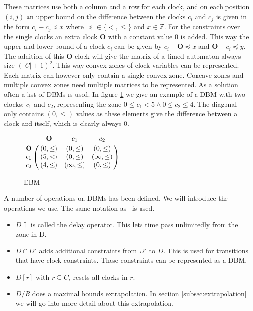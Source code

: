 These matrices use both a column and a row for each clock, and on each position $(i,j)$ an upper bound on the difference between the clocks $c_i$ and $c_j$ is given in the form $c_i - c_j \preceq x$ where $\preceq \in \{<, \leq\}$ and $x \in \mathbb{Z}$. For the constraints over the single clocks an extra clock $\mathbf{O}$ with a constant value 0 is added. This way the upper and lower bound of a clock $c_i$ can be given by $c_i - \mathbf{O} \preceq x$ and $\mathbf{O} - c_i \preceq y$. The addition of this $\mathbf{O}$ clock will give the matrix of a timed automaton always size $(|C|+1)^2$. This way convex zones of clock variables can be represented. Each matrix can however only contain a single convex zone. Concave zones and multiple convex zones need multiple matrices to be represented. As a solution often a list of DBMs is used. In figure \ref{fig:dbm} we give an example of a DBM with two clocks: $c_1$ and $c_2$, representing the zone $0 \leq c_1 < 5 \wedge 0 \leq c_2 \leq 4$. The diagonal only contains $(0,\leq)$ values as these elements give the difference between a clock and itself, which is clearly always 0.

\begin{figure}
	\centering
	\begin{math}
 \bordermatrix{ 		                 & \mathbf{O} & c_1           & c_2        \cr
 			\mathbf{O} &(0,\leq)      & (0,\leq)      & (0,\leq)     \cr
 			c_1        &(5,<   )      & (0,\leq)      & (\infty,\leq)\cr
 			c_2        &(4,\leq)      & (\infty,\leq) & (0,\leq)     \cr}
	\end{math}
	\caption{DBM}
	\label{fig:dbm}
\end{figure}

A number of operations on DBMs has been defined. We will introduce the operations we use. The same notation as~\cite{eemcs21972} is used.
\begin{itemize}
\item $D \uparrow$ is called the delay operator. This lets time pass unlimitedly from the zone in D.
\item $D \cap D'$ adds additional constraints from $D'$ to $D$. This is used for transitions that have clock constraints. These constraints can be represented as a DBM.
\item $D[r]$ with $r \subseteq C$, resets all clocks in $r$.
\item $D/B$ does a maximal bounds extrapolation. In section \ref{subsec:extrapolation} we will go into more detail about this extrapolation.

\end{itemize}

